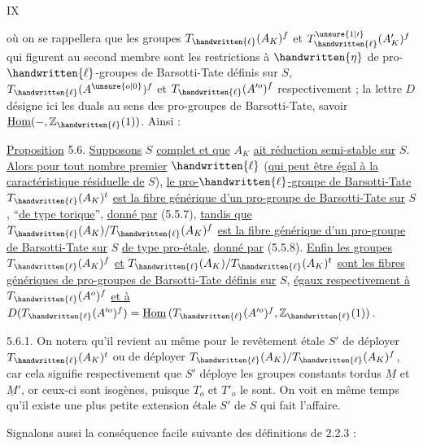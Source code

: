 \hfill IX

où on se rappellera que les groupes $T_{\handwritten{\ell}}(A_K)^f$ et $T_{\handwritten{\ell}}^{\unsure{1|\prime}}(A'_K)^f$ qui figurent au second membre sont les restrictions à $\handwritten{\eta}$ de pro-$\handwritten{\ell}$-groupes de Barsotti-Tate définis sur $S$, $T_{\handwritten{\ell}}(A^{\unsure{o|0}})^f$ et $T_{\handwritten{\ell}}(A^{\prime o})^f$ respectivement ; la lettre $D$ désigne ici les duals au sens des pro-groupes de Barsotti-Tate, savoir $\underline{\mathrm{Hom}}(-,\mathbb{Z}_{\handwritten{\ell}}(1))$. Ainsi :

\uline{Proposition} 5.6. \uline{Supposons} $S$ \uline{complet et que} $A_K$ \uline{ait réduction semi-stable sur} $S$. \uline{Alors pour tout nombre premier} $\handwritten{\ell}$ (\uline{qui peut être égal à la caractéristique résiduelle de} $S$), \uline{le pro-}$\handwritten{\ell}$\uline{-groupe de Barsotti-Tate} $T_{\handwritten{\ell}}(A_K)^t$ \uline{est la fibre générique d'un pro-groupe de Barsotti-Tate sur} $S$, ``\uline{de type torique}'', \uline{donné par} (5.5.7), \uline{tandis que} $T_{\handwritten{\ell}}(A_K)/T_{\handwritten{\ell}}(A_K)^f$ \uline{est la fibre générique d'un pro-groupe de Barsotti-Tate sur} $S$ \uline{de type pro-étale}, \uline{donné par} (5.5.8). \uline{Enfin les groupes} $T_{\handwritten{\ell}}(A_K)^f$ \uline{et} $T_{\handwritten{\ell}}(A_K)/T_{\handwritten{\ell}}(A_K)^t$ \uline{sont les fibres génériques de pro-groupes de Barsotti-Tate définis sur} $S$, \uline{égaux respectivement à} $T_{\handwritten{\ell}}(A^o)^f$ \uline{et à} $D(T_{\handwritten{\ell}}(A^{\prime o})^f)=\underline{\mathrm{Hom}}\,(T_{\handwritten{\ell}}(A^{\prime o})^f,\mathbb{Z}_{\handwritten{\ell}}(1))$.

5.6.1. On notera qu'il revient au même pour le revêtement étale $S'$ de déployer $T_{\handwritten{\ell}}(A_K)^t$ ou de déployer $T_{\handwritten{\ell}}(A_K)/T_{\handwritten{\ell}}(A_K)^f$, car cela signifie respectivement que $S'$ déploye les groupes constants tordus $\underline{M}$ et $\underline{M}'$, or ceux-ci sont isogènes, puisque $T_o$ et $T'_o$ le sont. On voit en même temps qu'il existe une plus petite extension étale $S'$ de $S$ qui fait l'affaire.

Signalons aussi la conséquence facile suivante des définitions de 2.2.3 :

